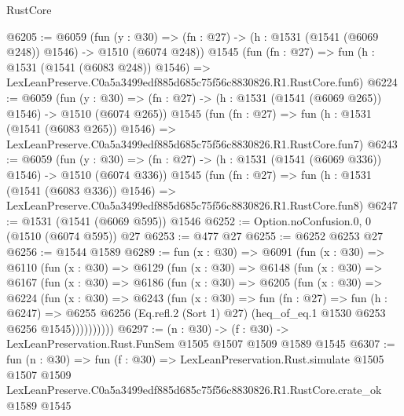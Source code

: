 \begin{lexlean}{RustCore}
\begin{coremodule}
@6205 := @6059
    (fun (y : @30) => (fn : @27) -> (h : @1531 (@1541 (@6069 @248)) @1546) -> @1510 (@6074 @248))
    @1545
    (fun (fn : @27) =>
    fun (h : @1531 (@1541 (@6083 @248)) @1546) =>
    LexLeanPreserve.C0a5a3499edf885d685c75f56c8830826.R1.RustCore.fun6)
@6224 := @6059
    (fun (y : @30) => (fn : @27) -> (h : @1531 (@1541 (@6069 @265)) @1546) -> @1510 (@6074 @265))
    @1545
    (fun (fn : @27) =>
    fun (h : @1531 (@1541 (@6083 @265)) @1546) =>
    LexLeanPreserve.C0a5a3499edf885d685c75f56c8830826.R1.RustCore.fun7)
@6243 := @6059
    (fun (y : @30) => (fn : @27) -> (h : @1531 (@1541 (@6069 @336)) @1546) -> @1510 (@6074 @336))
    @1545
    (fun (fn : @27) =>
    fun (h : @1531 (@1541 (@6083 @336)) @1546) =>
    LexLeanPreserve.C0a5a3499edf885d685c75f56c8830826.R1.RustCore.fun8)
@6247 := @1531 (@1541 (@6069 @595)) @1546
@6252 := Option.noConfusion.{0, 0} (@1510 (@6074 @595)) @27
@6253 := @477 @27
@6255 := @6252 @6253 @27
@6256 := @1544 @1589
@6289 := fun (x : @30) =>
  @6091
    (fun (x : @30) =>
    @6110
      (fun (x : @30) =>
      @6129
        (fun (x : @30) =>
        @6148
          (fun (x : @30) =>
          @6167
            (fun (x : @30) =>
            @6186
              (fun (x : @30) =>
              @6205
                (fun (x : @30) =>
                @6224
                  (fun (x : @30) =>
                  @6243
                    (fun (x : @30) =>
                    fun (fn : @27) =>
                    fun (h : @6247) =>
                    @6255
                      @6256
                      (Eq.refl.{2} (Sort 1) @27)
                      (heq_of_eq.{1} @1530 @6253 @6256 @1545))))))))))
@6297 := (n : @30) -> (f : @30) -> LexLeanPreservation.Rust.FunSem @1505 @1507 @1509 @1589 @1545
@6307 := fun (n : @30) =>
  fun (f : @30) =>
  LexLeanPreservation.Rust.simulate
    @1505
    @1507
    @1509
    LexLeanPreserve.C0a5a3499edf885d685c75f56c8830826.R1.RustCore.crate_ok
    @1589
    @1545
\end{coremodule}
\end{lexlean}
